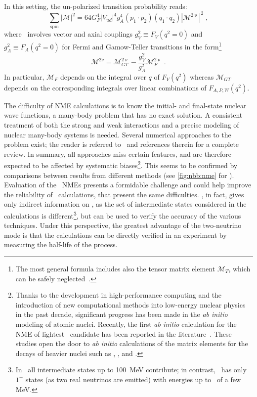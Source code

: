 In this setting, the un-polarized transition probability reads:
\begin{equation}\label{eq:nbb:trans-prob}
  \sum_\text{spin} |\mathcal{M}|^2 = 64 G^4_F |V_{ud}|^4 g^4_A (p_1 \cdot p_2)
                                     (q_1 \cdot q_2) |\mathcal{M}^{2\upnu}|^2 \;,
\end{equation}
where \nmet\ involves vector and axial couplings $g^2_V \equiv F_V(q^2=0)$ and $g^2_A
\equiv F_A(q^2=0)$ for Fermi and Gamow-Teller transitions in the form\footnote{%
  The most general formula includes also the tensor matrix element $\mathcal{M}_T$, which
  can be safely neglected~\cite{Engel2017}.
}
\[
  \mathcal{M}^{2\nu} = \mathcal{M}^{2\upnu}_{GT} -
                       \frac{g^2_V}{g^2_A} \mathcal{M}^{2\upnu}_F \;.
\]
In particular, $\mathcal{M}_F$ depends on the integral over $q$ of $F_V(q^2)$ whereas
$\mathcal{M}_{GT}$ depends on the corresponding integrals over linear combinations of
$F_{A,P,W}(q^2)$.

The difficulty of NME calculations is to know the initial- and final-state nuclear wave
functions, a many-body problem that has no exact solution. A consistent treatment of both the
strong and weak interactions and a precise modeling of nuclear many-body systems is
needed.
Several numerical approaches to
the problem exist; the reader is referred to~\cite{Engel2017} and references therein for a
complete review. In summary, all approaches miss certain features, and are therefore
expected to be affected by systematic biases\footnote{%
  Thanks to the development in high-performance computing and the introduction of new
  computational methods into low-energy nuclear physics in the past decade, significant
  progress has been made in the \emph{ab initio} modeling of atomic nuclei. Recently, the
  first \emph{ab initio} calculation for the NME of lightest \onbb\ candidate 
  has been reported in the literature~\cite{Yao2019}. These studies open the door to
  \emph{ab initio} calculations of the matrix elements for the decays of heavier nuclei
  such as \gesix, , and .
}. This seems to be confirmed by comparisons between results from different methods (see
\cref{fig:nbb:nme} for \onbb). Evaluation of the \nnbb\ NMEs presents a formidable
challenge and could help improve the reliability of \nmez\ calculations, that present the
same difficulties. \nnbb, in fact, gives only indirect information on \onbb, as the set of
intermediate states considered in the calculations is different\footnote{%
  In \onbb\ all intermediate states up to 100~MeV contribute; in contrast, \nnbb\ has only
  $1^+$ states (as two real neutrinos are emitted) with energies up to \qbb\ of a few MeV.
}, but can be used to verify the accuracy of the various techniques.  Under this
perspective, the greatest advantage of the two-neutrino mode is that the calculations can
be directly verified in an experiment by measuring the half-life of the process.

